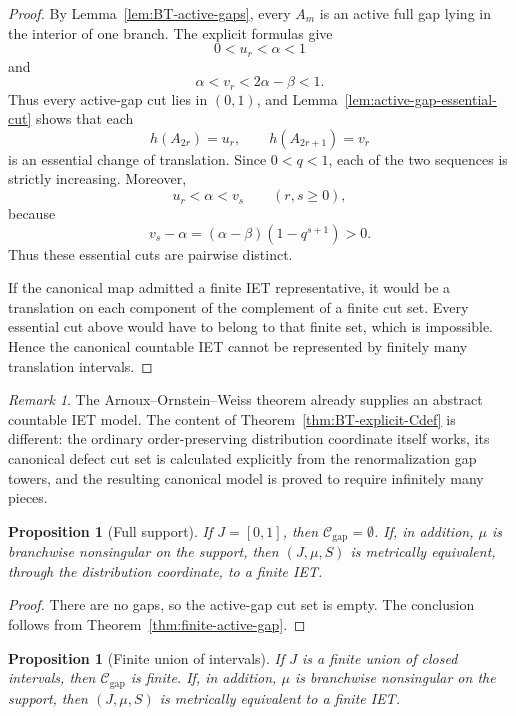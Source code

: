 \documentclass[11pt]{amsart}
\theoremstyle{plain}
\newtheorem{proposition}[theorem]{Proposition}
\theoremstyle{definition}
\theoremstyle{remark}
\newtheorem{remark}[theorem]{Remark}
\newcommand{\cC}{\mathcal C}
\begin{document}
\begin{proof}
By Lemma~\ref{lem:BT-active-gaps}, every \(A_m\) is an active full gap lying in the interior
of one branch. The explicit formulas give
\[
        0<u_r<\alpha<1
\]
and
\[
        \alpha<v_r<2\alpha-\beta<1.
\]
Thus every active-gap cut lies in \((0,1)\), and
Lemma~\ref{lem:active-gap-essential-cut} shows that each
\[
        h(A_{2r})=u_r,
        \qquad
        h(A_{2r+1})=v_r
\]
is an essential change of translation. Since \(0<q<1\), each of the two sequences is
strictly increasing. Moreover,
\[
        u_r<\alpha<v_s
        \qquad(r,s\geq0),
\]
because
\[
        v_s-\alpha=(\alpha-\beta)(1-q^{s+1})>0.
\]
Thus these essential cuts are pairwise distinct.

If the canonical map admitted a finite IET representative, it would be a translation on each
component of the complement of a finite cut set. Every essential cut above would have to
belong to that finite set, which is impossible. Hence the canonical countable IET cannot be
represented by finitely many translation intervals.
\end{proof}

\begin{remark}
The Arnoux--Ornstein--Weiss theorem already supplies an abstract countable IET model. The content of Theorem~\ref{thm:BT-explicit-Cdef} is different: the ordinary
order-preserving distribution coordinate itself works, its canonical defect cut set is calculated
explicitly from the renormalization gap towers, and the resulting canonical model is proved
to require infinitely many pieces.
\end{remark}

\begin{proposition}[Full support]\label{prop:full-support}
If \(J=[0,1]\), then \(\cC_{\mathrm{gap}}=\emptyset\). If, in addition, \(\mu\) is
branchwise nonsingular on the support, then \((J,\mu,S)\) is metrically equivalent, through
the distribution coordinate, to a finite IET.
\end{proposition}

\begin{proof}
There are no gaps, so the active-gap cut set is empty. The conclusion follows from
Theorem~\ref{thm:finite-active-gap}.
\end{proof}

\begin{proposition}[Finite union of intervals]\label{prop:finite-union}
If \(J\) is a finite union of closed intervals, then \(\cC_{\mathrm{gap}}\) is finite. If,
in addition, \(\mu\) is branchwise nonsingular on the support, then
\((J,\mu,S)\) is metrically equivalent to a finite IET.
\end{proposition}
\end{document}
